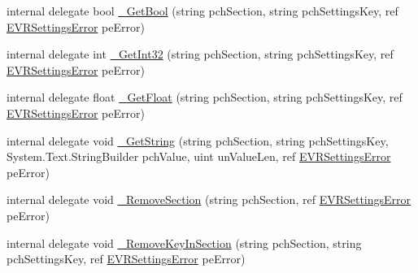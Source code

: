 \begin{DoxyCompactItemize}
\item 
internal delegate bool \mbox{\hyperlink{struct_valve_1_1_v_r_1_1_i_v_r_settings_abaf963d85e971362f843cd98503893c6}{\+\_\+\+Get\+Bool}} (string pch\+Section, string pch\+Settings\+Key, ref \mbox{\hyperlink{namespace_valve_1_1_v_r_aeab7722b211afc3885ed77faa931291f}{E\+V\+R\+Settings\+Error}} pe\+Error)
\item 
internal delegate int \mbox{\hyperlink{struct_valve_1_1_v_r_1_1_i_v_r_settings_a8477f6872b134bfeb56540d1f1945230}{\+\_\+\+Get\+Int32}} (string pch\+Section, string pch\+Settings\+Key, ref \mbox{\hyperlink{namespace_valve_1_1_v_r_aeab7722b211afc3885ed77faa931291f}{E\+V\+R\+Settings\+Error}} pe\+Error)
\item 
internal delegate float \mbox{\hyperlink{struct_valve_1_1_v_r_1_1_i_v_r_settings_a56022255db980ce1cdb32396f706c8b7}{\+\_\+\+Get\+Float}} (string pch\+Section, string pch\+Settings\+Key, ref \mbox{\hyperlink{namespace_valve_1_1_v_r_aeab7722b211afc3885ed77faa931291f}{E\+V\+R\+Settings\+Error}} pe\+Error)
\item 
internal delegate void \mbox{\hyperlink{struct_valve_1_1_v_r_1_1_i_v_r_settings_a5e71f8b4740ba05ea4fa424674adefbb}{\+\_\+\+Get\+String}} (string pch\+Section, string pch\+Settings\+Key, System.\+Text.\+String\+Builder pch\+Value, uint un\+Value\+Len, ref \mbox{\hyperlink{namespace_valve_1_1_v_r_aeab7722b211afc3885ed77faa931291f}{E\+V\+R\+Settings\+Error}} pe\+Error)
\item 
internal delegate void \mbox{\hyperlink{struct_valve_1_1_v_r_1_1_i_v_r_settings_a1bff5a9ce11b6a9f192cc9d9d34fbcfc}{\+\_\+\+Remove\+Section}} (string pch\+Section, ref \mbox{\hyperlink{namespace_valve_1_1_v_r_aeab7722b211afc3885ed77faa931291f}{E\+V\+R\+Settings\+Error}} pe\+Error)
\item 
internal delegate void \mbox{\hyperlink{struct_valve_1_1_v_r_1_1_i_v_r_settings_ae4d9e9b9f88da0eeb2887610e1c5ff89}{\+\_\+\+Remove\+Key\+In\+Section}} (string pch\+Section, string pch\+Settings\+Key, ref \mbox{\hyperlink{namespace_valve_1_1_v_r_aeab7722b211afc3885ed77faa931291f}{E\+V\+R\+Settings\+Error}} pe\+Error)
\end{DoxyCompactItemize}
